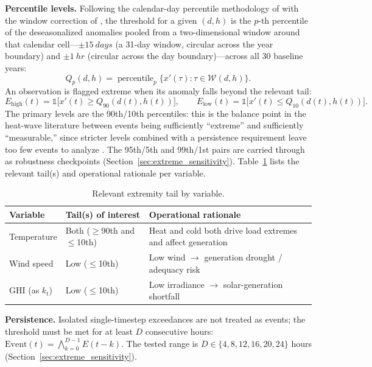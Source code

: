 \textbf{Percentile levels.} Following the calendar-day percentile methodology of
\citet{zhang2005} with the window correction of \citet{brunnervoigt2024}, the threshold for a
given $(d,h)$ is the $p$-th percentile of the deseasonalized anomalies pooled from a
two-dimensional window around that calendar cell---$\pm\SI{15}{days}$ (a 31-day window, circular
across the year boundary) and $\pm\SI{1}{hr}$ (circular across the day boundary)---across all 30
baseline years:
\[
Q_p(d,h) = \operatorname{percentile}_p\big\{x'(\tau) : \tau \in \mathcal{W}(d,h)\big\}.
\]
An observation is flagged extreme when its anomaly falls beyond the relevant tail:
\[
E_{\text{high}}(t) = \mathbb{1}\big[x'(t) \ge Q_{90}(d(t),h(t))\big], \qquad
E_{\text{low}}(t) = \mathbb{1}\big[x'(t) \le Q_{10}(d(t),h(t))\big].
\]
The primary levels are the 90th/10th percentiles: this is the balance point in the heat-wave
literature between events being sufficiently ``extreme'' and sufficiently ``measurable,'' since
stricter levels combined with a persistence requirement leave too few events to analyze
\citep{perkinsalexander2013}. The 95th/5th and 99th/1st pairs are carried through as robustness
checkpoints (Section~\ref{sec:extreme_sensitivity}). Table~\ref{tab:extreme_tails} lists the
relevant tail(s) and operational rationale per variable.

\begin{table}[H]
\centering
\begin{threeparttable}
\caption{Relevant extremity tail by variable.}
\label{tab:extreme_tails}
\begin{tabular}{lll}
\toprule
\textbf{Variable} & \textbf{Tail(s) of interest} & \textbf{Operational rationale} \\
\midrule
Temperature       & Both ($\ge$90th and $\le$10th) & Heat and cold both drive load extremes and affect generation \\
Wind speed        & Low ($\le$10th)                & Low wind $\rightarrow$ generation drought / adequacy risk \\
GHI (as $k_t$)     & Low ($\le$10th)                & Low irradiance $\rightarrow$ solar-generation shortfall \\
\bottomrule
\end{tabular}
\end{threeparttable}
\end{table}

\textbf{Persistence.} Isolated single-timestep exceedances are not treated as events; the
threshold must be met for at least $D$ consecutive hours:
$\text{Event}(t) = \bigwedge_{k=0}^{D-1} E(t-k)$. The tested range is $D \in \{4,8,12,16,20,24\}$
hours (Section~\ref{sec:extreme_sensitivity}).


